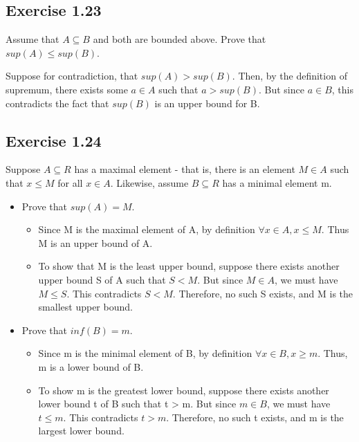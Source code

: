\documentclass[12pt]{article}
\begin{document}
		\subsection*{Exercise 1.23}
			Assume that $A \subseteq B$ and both are bounded above. Prove that $sup(A) \le sup(B)$.
			
			Suppose for contradiction, that $sup(A) > sup(B)$. Then, by the definition of supremum, there exists some $a \in A$ such that $a > sup(B)$. But since $a \in B$, this contradicts the fact that $sup(B)$ is an upper bound for B.
		\subsection*{Exercise 1.24}
			Suppose $A \subseteq R$ has a maximal element - that is, there is an element $M \in A$ such that $x \le M$ for all $x \in A$. Likewise, assume $B \subseteq R$ has a minimal element m.
			\begin{itemize}
				\item Prove that $sup(A) = M$.
				\begin{itemize}
					\item Since M is the maximal element of A, by definition $\forall x \in A, x \le M$. Thus M is an upper bound of A.
					\item To show that M is the least upper bound, suppose there exists another upper bound S of A such that $S < M$. But since $M \in A$, we must have $M \le S$. This contradicts $S < M$. Therefore, no such S exists, and M is the smallest upper bound.
				\end{itemize}
				\item Prove that $inf(B) = m$.
				\begin{itemize}
					\item Since m is the minimal element of B, by definition $\forall x \in B, x \ge m$. Thus, m is a lower bound of B.
					\item To show m is the greatest lower bound, suppose there exists another lower bound t of B such that t > m. But since $m \in B$, we must have $t \le m$. This contradicts $t > m$. Therefore, no such t exists, and m is the largest lower bound.
				\end{itemize}
			\end{itemize}
\end{document}
